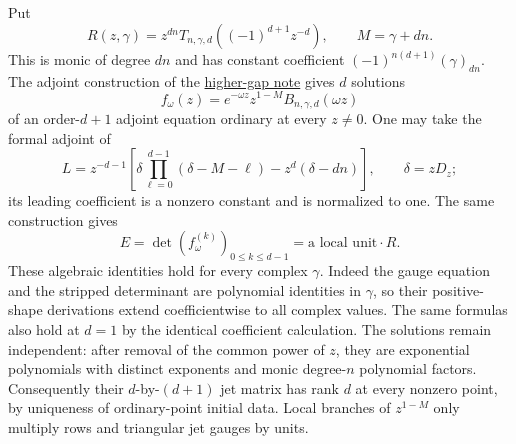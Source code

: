 \documentclass[11pt]{article}
\begin{document}
Put
\[
 R(z,\gamma)=z^{dn}T_{n,\gamma,d}((-1)^{d+1}z^{-d}),\qquad
 M=\gamma+dn.
\]
This is monic of degree $dn$ and has constant coefficient
$(-1)^{n(d+1)}(\gamma)_{dn}$.
The adjoint construction of the
\href{HIGHER_GAP_ADJOINT_RANK.tex}{higher-gap note} gives $d$ solutions
\[
 f_\omega(z)=e^{-\omega z}z^{1-M}B_{n,\gamma,d}(\omega z)
\]
of an order-$d+1$ adjoint equation ordinary at every $z\ne0$.
One may take the formal adjoint of
\[
 L=z^{-d-1}\left[\delta\prod_{\ell=0}^{d-1}(\delta-M-\ell)
                    -z^d(\delta-dn)\right],\qquad\delta=zD_z;
\]
its leading coefficient is a nonzero constant and is normalized to one.
The same construction gives
\[
 E=\det(f_\omega^{(k)})_{0\le k\le d-1}
       =\text{a local unit}\cdot R.
\]
These algebraic identities hold for every complex $\gamma$.
Indeed the gauge equation and the stripped determinant are polynomial
identities in $\gamma$, so their positive-shape derivations extend
coefficientwise to all complex values. The same formulas also hold
at $d=1$ by the identical coefficient calculation.
The solutions remain independent: after removal of the common power
of $z$, they are exponential polynomials with distinct exponents and
monic degree-$n$ polynomial factors.
Consequently their $d$-by-$(d+1)$ jet matrix has rank $d$ at every
nonzero point, by uniqueness of ordinary-point initial data.
Local branches of $z^{1-M}$ only multiply rows and triangular jet
gauges by units.
\end{document}
